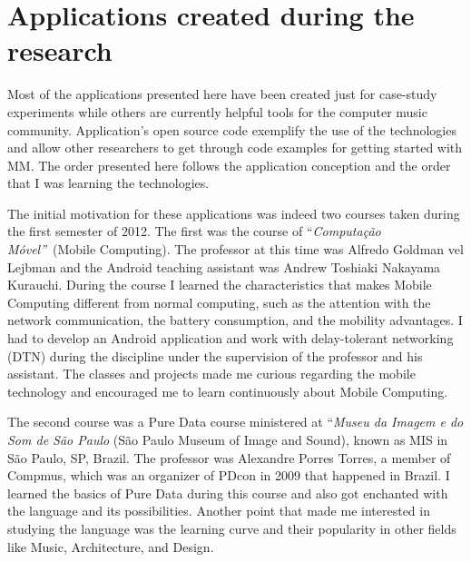 \chapter{Applications created during the research}
\label{cap:applications}





Most of the applications presented here have been created just for case-study experiments while others are currently helpful tools for the computer music community.
Application's open source code exemplify the use of the technologies and allow other researchers to get through code examples for getting started with MM.
The order presented here follows the application conception and the order that I was learning the technologies.

The initial motivation for these applications was indeed two courses taken during the first semester of 2012.
The first was the course of ``\textit{Computação Móvel''}~(Mobile Computing).
The professor at this time was Alfredo Goldman vel Lejbman and the Android teaching assistant was Andrew Toshiaki Nakayama Kurauchi. %
During the course I learned the characteristics that makes Mobile Computing different from normal computing, such as the attention with the network communication, the battery consumption, and the mobility advantages. %
I had to develop an Android application and work with delay-tolerant networking (DTN) during the discipline under the supervision of the professor and his assistant.
The classes and projects made me curious regarding the mobile technology and encouraged me to learn continuously about Mobile Computing.

The second course was a Pure Data course ministered at ``\textit{Museu da Imagem e do Som de São Paulo} (São Paulo Museum of Image and Sound), known as MIS in São Paulo, SP, Brazil.
The professor was Alexandre Porres Torres, a member of Compmus, which was an organizer of PDcon in 2009 that happened in Brazil.
I learned the basics of Pure Data during this course and also got enchanted with the language and its possibilities.
Another point that made me interested in studying the language was the learning curve and their popularity in other fields like Music, Architecture, and Design.


